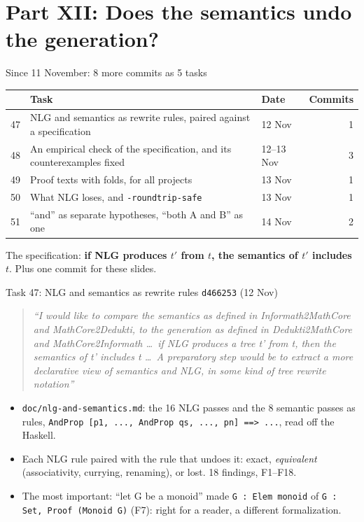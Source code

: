 \documentclass[10pt,aspectratio=169]{beamer}
\newcommand{\bad}[1]{\textcolor{warn}{#1}}
\newcommand{\ok}[1]{\textcolor{good}{#1}}
\newcommand{\commit}[1]{\texttt{\footnotesize #1}}
\newcommand{\prompt}[1]{\begin{quote}\small\itshape ``#1''\end{quote}}
\begin{document}
\section{Part XII: Does the semantics undo the generation?}

\begin{frame}{Since 11 November: 8 more commits as 5 tasks}
  \footnotesize
  \begin{tabular}{rllr}
    \toprule
    & \textbf{Task} & \textbf{Date} & \textbf{Commits} \\
    \midrule
    47 & NLG and semantics as rewrite rules, paired against a specification & 12 Nov & 1 \\
    48 & An empirical check of the specification, and its counterexamples fixed & 12--13 Nov & 3 \\
    49 & Proof texts with folds, for all projects & 13 Nov & 1 \\
    50 & What NLG loses, and \texttt{-roundtrip-safe} & 13 Nov & 1 \\
    51 & ``and'' as separate hypotheses, ``both A and B'' as one & 14 Nov & 2 \\
    \bottomrule
  \end{tabular}

  \vspace{0.5em}
  The specification: \textbf{if NLG produces $t'$ from $t$, the semantics of $t'$ includes
  $t$}. Plus one commit for these slides.
\end{frame}

\begin{frame}{Task 47: NLG and semantics as rewrite rules}
  \commit{d466253} (12 Nov)
  \prompt{I would like to compare the semantics as defined in Informath2MathCore and
  MathCore2Dedukti, to the generation as defined in Dedukti2MathCore and MathCore2Informath
  \ldots\ if NLG produces a tree t' from t, then the semantics of t' includes t \ldots\ A
  preparatory step would be to extract a more declarative view of semantics and NLG, in some
  kind of tree rewrite notation}
  \begin{itemize}\small
    \item \texttt{doc/nlg-and-semantics.md}: the 16 NLG passes and the 8 semantic passes as
          rules, \texttt{AndProp [p1, ..., AndProp qs, ..., pn] ==> ...}, read off the
          Haskell.
    \item Each NLG rule paired with the rule that undoes it: \ok{exact}, \emph{equivalent}
          (associativity, currying, renaming), or \bad{lost}. 18 findings, F1--F18.
    \item The most important: \bad{``let G be a monoid''} made \texttt{G : Elem monoid} of
          \texttt{G : Set, Proof (Monoid G)} (F7): right for a reader, a different
          formalization.
  \end{itemize}
\end{frame}
\end{document}
